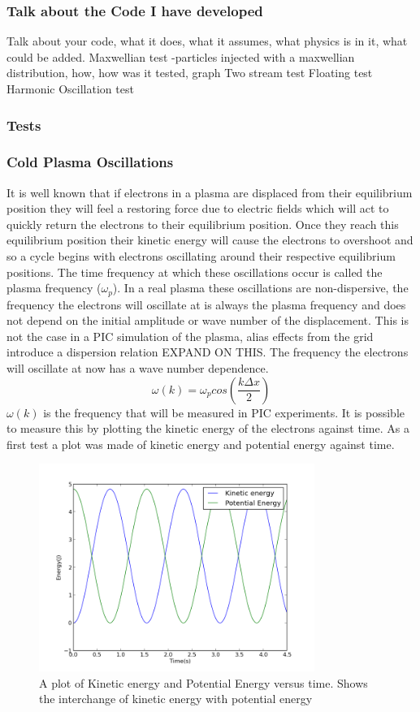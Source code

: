 \documentclass[12pt]{article}
\def\be{\begin{equation}}
\def\ee{\end{equation}}
\begin{document}
\subsubsection{Talk about the Code I have developed}
Talk about your code, what it does, what it assumes, what physics is in it, what could be added. 
Maxwellian test -particles injected with a maxwellian distribution, how, how was it tested, graph
Two stream test
Floating test 
Harmonic Oscillation test
\subsubsection{Tests}
\subsubsection{Cold Plasma Oscillations} 
It is well known that if electrons in a plasma are displaced from their equilibrium position they will feel a restoring force due to electric fields which will act to quickly return the electrons to their equilibrium position. Once they reach this equilibrium position their kinetic energy will cause the electrons to overshoot and so a cycle begins with electrons oscillating around their respective equilibrium positions. The time frequency at which these oscillations occur is called the plasma frequency ($\omega_p$). 
In a real plasma these oscillations are non-dispersive, the frequency the electrons will oscillate at is always the plasma frequency and does not depend on the initial amplitude or wave number of the displacement. This is not the case in a PIC simulation of the plasma, alias effects from the grid introduce a dispersion relation EXPAND ON THIS. The frequency the electrons will oscillate at now has a wave number dependence. 
\be 
\omega(k) = \omega_p cos\left(\frac{k \Delta x }{2} \right) 
\ee
$\omega(k)$ is the frequency that will be measured in PIC experiments. It is possible to measure this by plotting the kinetic energy of the electrons against time. As a first test a plot was made of kinetic energy and potential energy against time.
\begin{figure}[H]
\centering
\includegraphics[width=0.8\textwidth]{keandpe.png}
\caption{A plot of Kinetic energy and Potential Energy versus time. Shows the interchange of kinetic energy with potential energy}
\end{figure}
\end{document}
